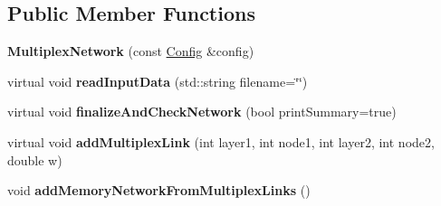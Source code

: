 \subsection*{Public Member Functions}
\begin{DoxyCompactItemize}
\item 
\mbox{\label{classMultiplexNetwork_a4a46456af1428bf8696574a4e1a6444a}} 
{\bfseries Multiplex\+Network} (const \mbox{\hyperlink{structConfig}{Config}} \&config)
\item 
\mbox{\label{classMultiplexNetwork_a8ac0494e3647cf6ed21875cce81f5076}} 
virtual void {\bfseries read\+Input\+Data} (std\+::string filename=\char`\"{}\char`\"{})
\item 
\mbox{\label{classMultiplexNetwork_a6ab8cd2cb02ca3b6b96040418668855f}} 
virtual void {\bfseries finalize\+And\+Check\+Network} (bool print\+Summary=true)
\item 
\mbox{\label{classMultiplexNetwork_a56309f8e4ef8faaa359012377f0ba849}} 
virtual void {\bfseries add\+Multiplex\+Link} (int layer1, int node1, int layer2, int node2, double w)
\item 
\mbox{\label{classMultiplexNetwork_a346dbbd0838137935ef8ad20a9967286}} 
void {\bfseries add\+Memory\+Network\+From\+Multiplex\+Links} ()
\end{DoxyCompactItemize}
